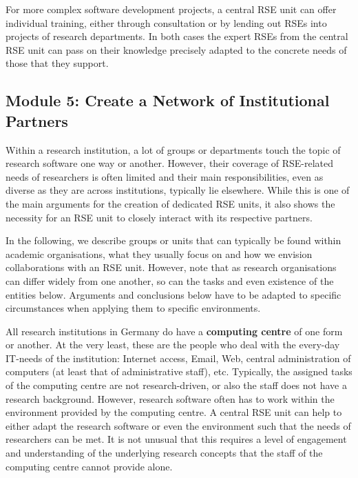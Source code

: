 \documentclass[a4paper]{article}
\begin{document}
For more complex software development projects, a central RSE unit can offer individual training, either through consultation or by lending out RSEs into projects of research departments.
In both cases the expert RSEs from the central RSE unit can pass on their knowledge precisely adapted to the concrete needs of those that they support.

\subsection{Module 5: Create a Network of Institutional Partners}%
\label{sec:partners}

Within a research institution, a lot of groups or departments touch the topic of research software one way or another.
However, their coverage of RSE-related needs of researchers is often limited and their main responsibilities, even as diverse as they are across institutions, typically lie elsewhere.
While this is one of the main arguments for the creation of dedicated RSE units, it also shows the necessity for an RSE unit to closely interact with its respective partners.

In the following, we describe groups or units that can typically be found within academic organisations,
what they usually focus on and how we envision collaborations with an RSE unit.
However, note that as research organisations can differ widely from one another, so can the tasks and even existence of the entities below.
Arguments and conclusions below have to be adapted to specific circumstances when applying them to specific environments.

All research institutions in Germany do have a \textbf{computing centre} of one form or another.
At the very least, these are the people who deal with the every-day IT-needs of the institution:
Internet access, Email, Web, central administration of computers (at least that of administrative staff), etc.
Typically, the assigned tasks of the computing centre are not research-driven, or also the staff does not have a research background.
However, research software often has to work within the environment provided by the computing centre.
A central RSE unit can help to either adapt the research software or even the environment such that the needs of researchers can be met.
It is not unusual that this requires a level of engagement and understanding of the underlying research concepts that the staff of the computing centre cannot provide alone.
\end{document}

